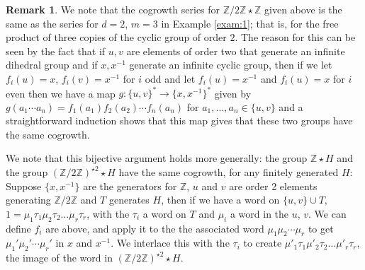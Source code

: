 \documentclass[11pt]{amsart}
\theoremstyle{definition}
\newtheorem{example}[theorem]{Example}
\newtheorem{remark}[theorem]{Remark}
\begin{document}
\begin{remark}\label{remark:cogrowth_equiv} 
We note that the cogrowth series for $\mathbb{Z}/2\mathbb{Z}\star \mathbb{Z}$ given above is the same as the series for $d=2$, $m=3$ in Example \ref{exam:1}; that is, for the free product of three copies of the cyclic group of order $2$.  The reason for this can be seen by the fact that if $u,v$ are elements of order two that generate an infinite dihedral group and if $x,x^{-1}$ generate an infinite cyclic group, then if we let $f_i(u)=x$, $f_i(v)=x^{-1}$ for $i$ odd and let $f_i(u)=x^{-1}$ and $f_i(u)=x$ for $i$ even then we have a map $g:\{u,v\}^*\to \{x,x^{-1}\}^*$ given by
$g(a_1\cdots a_n)=f_1(a_1)f_2(a_2)\cdots f_n(a_n)$ for $a_1,\ldots
,a_n\in\{u,v\}$ and a straightforward induction shows that this map
gives that these two groups have the same cogrowth. 


We note that this bijective argument holds more generally: the group $\mathbb{Z}\star H$
  and the group $(\mathbb{Z}/2\mathbb{Z})^{\star 2} \star H$ have the same cogrowth, for any finitely
  generated $H$: Suppose $\{x,x^{-1}\}$ are the generators for
  $\mathbb{Z}$, $u$ and $v$ are order 2 elements generating
  $\mathbb{Z}/2\mathbb{Z}$ and $T$ generates $H$, then if we have a
  word on $\{u,v\} \cup T$, $1= \mu_1 \tau_1 \mu_2 \tau_2 \dots
  \mu_r \tau_r$, with the $\tau_i$ a word on $T$ and $\mu_i$ a word in
  the $u$, $v$. We can define $f_i$ are above, and apply it to the the associated
  word $\mu_1\mu_2\cdots \mu_r$ to get $\mu_1' \mu_2'\cdots \mu_r'$ in $x$ and
  $x^{-1}$. We interlace this
  with the $\tau_i$ to create $\mu'_1 \tau_1 \mu'_2 \tau_2 \dots
  \mu'_r \tau_r$, the image of the word in $(\mathbb{Z}/2\mathbb{Z})^{\star 2} \star H$. 
\end{remark}
\end{document}
